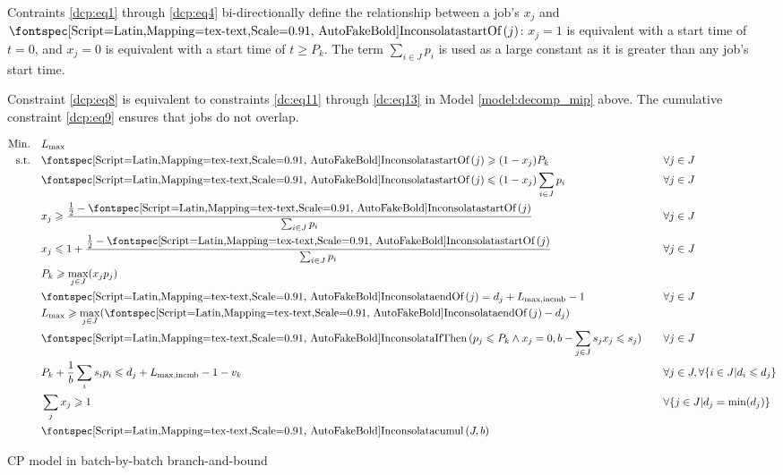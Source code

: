 \documentclass[13pt, letterpaper, oneside]{book}
\begin{document}
Contraints \eqref{dcp:eq1} through \eqref{dcp:eq4} bi-directionally define the
relationship between a job's $x_j$ and $\startOf(j)$: $x_j = 1$ is equivalent
with a start time of $t = 0$, and $x_j = 0$ is equivalent with a start time of
$t \geq P_k$. The term $\sum_{i \in J} p_i$ is used as a large constant as it is
greater than any job's start time.

Constraint \eqref{dcp:eq8} is equivalent to constraints \eqref{dc:eq11} through
\eqref{dc:eq13} in Model \ref{model:decomp_mip} above. The cumulative constraint
\eqref{dcp:eq9} ensures that jobs do not overlap. 

\begin{model}[h!]
\begin{alignat}{2}
\mathrm{Min.} \quad & \Lmax \quad && \\
\mathrm{s.t.} \quad 
& \label{dcp:eq1} \startOf(j) \geq (1-x_j) P_k \quad && \forall j \in J \\
& \startOf(j) \leq (1-x_j) \sum_{i \in J} p_i \quad && \forall j \in J \\
& x_j \geq \frac{ \frac{1}{2} - \startOf(j) }{ \sum_{i \in J} p_i } \quad &&
\forall j \in J \\
& \label{dcp:eq4} x_j \leq 1+\frac{ \frac{1}{2} - \startOf(j)}{\sum_{i \in J} p_i } \quad &&
\forall j \in J \\
& P_k \geq \underset{j \in J}{\max}(x_j p_j) \quad && \\
& \endOf(j) = d_j + L_{\text{max,incmb}} - 1 \quad && \forall j \in J \\
& \Lmax \geq \underset{j \in J}{\max}(\endOf(j) - d_j) \quad &&  \\
& \label{dcp:eq8} \mathtt{IfThen}(p_j \leq P_k \land x_j = 0, b - \sum_{j \in J} s_j
x_j \leq s_j) \quad && \forall j \in J \\
& P_k + \frac{1}{b} \sum_i s_i p_i \leq d_j + L_{\text{max,incmb}} - 1 - v_k
\quad && \forall j \in J, \forall \{i \in J | d_i \leq d_j\} \\
& \sum_j x_j \geq 1 \quad && \forall \{ j \in J | d_j = \min(d_j) \} \\
& \label{dcp:eq9} \mathtt{cumul}(J, b) \quad & &  
\end{alignat}
\caption{CP model in batch-by-batch branch-and-bound}
\label{model:decomp_cp}
\end{model}

\end{document}
